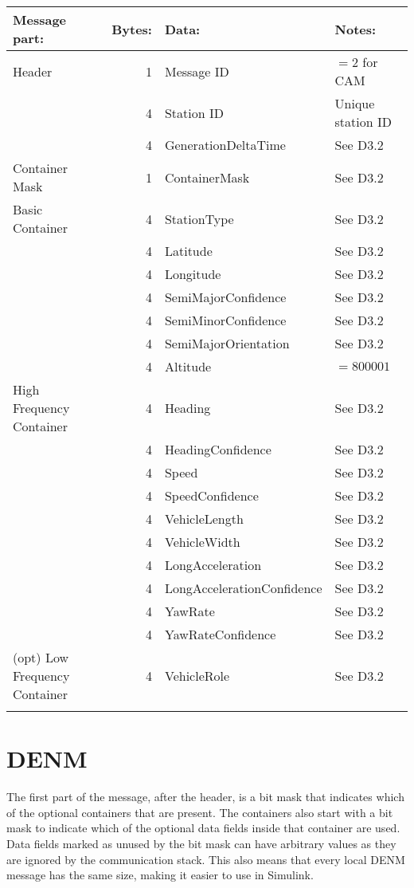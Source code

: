 \documentclass[11pt]{article}
\begin{document}
\begin{center}
\begin{tabular}{lrll}
Message part: & Bytes: & Data: & Notes:\\
\hline
Header & 1 & Message ID & \(=2\) for CAM\\
 & 4 & Station ID & Unique station ID\\
 & 4 & GenerationDeltaTime & See D3.2\\
\hline
Container Mask & 1 & ContainerMask & See D3.2\\
\hline
Basic Container & 4 & StationType & See D3.2\\
 & 4 & Latitude & See D3.2\\
 & 4 & Longitude & See D3.2\\
 & 4 & SemiMajorConfidence & See D3.2\\
 & 4 & SemiMinorConfidence & See D3.2\\
 & 4 & SemiMajorOrientation & See D3.2\\
 & 4 & Altitude & \(=800 001\)\\
\hline
High Frequency Container & 4 & Heading & See D3.2\\
 & 4 & HeadingConfidence & See D3.2\\
 & 4 & Speed & See D3.2\\
 & 4 & SpeedConfidence & See D3.2\\
 & 4 & VehicleLength & See D3.2\\
 & 4 & VehicleWidth & See D3.2\\
 & 4 & LongAcceleration & See D3.2\\
 & 4 & LongAccelerationConfidence & See D3.2\\
 & 4 & YawRate & See D3.2\\
 & 4 & YawRateConfidence & See D3.2\\
\hline
(opt) Low Frequency Container & 4 & VehicleRole & See D3.2\\
 &  &  & \\
\end{tabular}
\end{center}


\newpage
\section{DENM}
\label{sec:orgheadline3}
The first part of the message, after the header, is a bit mask that
indicates which of the optional containers that are present. The
containers also start with a bit mask to indicate which of the
optional data fields inside that container are used. Data fields
marked as unused by the bit mask can have arbitrary values as they are
ignored by the communication stack. This also means that every local
DENM message has the same size, making it easier to use in Simulink.
\end{document}
